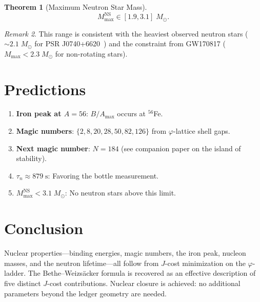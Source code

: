 \documentclass[12pt,a4paper]{article}
\newtheorem{theorem}{Theorem}[section]
\theoremstyle{definition}
\theoremstyle{remark}
\newtheorem{remark}[theorem]{Remark}
\begin{document}
\begin{theorem}[Maximum Neutron Star Mass]
\label{thm:ns}
\begin{equation}
  M_{\max}^{\mathrm{NS}} \in [1.9, 3.1]\;M_\odot.
\end{equation}
\end{theorem}

\begin{remark}
This range is consistent with the heaviest observed neutron stars
($\sim 2.1\;M_\odot$ for PSR J0740+6620~\cite{Cromartie2020})
and the constraint from GW170817 ($M_{\max} < 2.3\;M_\odot$
for non-rotating stars).
\end{remark}

\section{Predictions}
\label{sec:predictions}

\begin{enumerate}
  \item \textbf{Iron peak at $A = 56$}: $B/A_{\max}$ occurs at
  ${}^{56}$Fe.

  \item \textbf{Magic numbers}: $\{2, 8, 20, 28, 50, 82, 126\}$
  from $\varphi$-lattice shell gaps.

  \item \textbf{Next magic number}: $N = 184$ (see companion
  paper on the island of stability).

  \item \textbf{$\tau_n \approx 879\;\mathrm{s}$}: Favoring the
  bottle measurement.

  \item \textbf{$M_{\max}^{\mathrm{NS}} < 3.1\;M_\odot$}: No
  neutron stars above this limit.
\end{enumerate}

\section{Conclusion}
\label{sec:conclusion}

Nuclear properties---binding energies, magic numbers, the iron peak,
nucleon masses, and the neutron lifetime---all follow from $J$-cost
minimization on the $\varphi$-ladder.  The Bethe--Weizs\"acker
formula is recovered as an effective description of five distinct
$J$-cost contributions.  Nuclear closure is achieved: no additional
parameters beyond the ledger geometry are needed.
\end{document}
